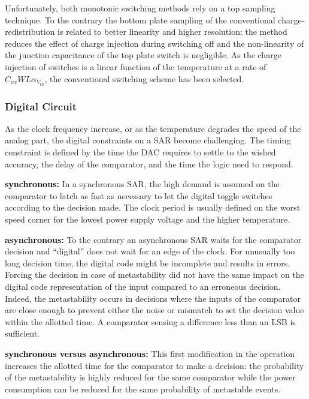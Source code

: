 Unfortunately, both monotonic switching methods rely on a top sampling technique. To the contrary the bottom plate sampling of the conventional charge-redistribution is related to better linearity and higher resolution: the method reduces the effect of charge injection during switching off and the non-linearity of the junction capacitance of the top plate switch is negligible. As the charge injection of switches is a linear function of the temperature at a rate of \(C_{ox}WL\alpha_{V_{th}}\), the conventional switching scheme has been selected.

	\subsubsection{Digital Circuit}         %
As the clock frequency increase, or as the temperature degrades the speed of the analog part, the digital constraints on a SAR become challenging. The timing constraint is defined by the time the DAC requires to settle to the wished accuracy, the delay of the comparator, and the time the logic need to respond.

\textbf{\textcolor{black}{synchronous:}}
In a synchronous SAR, the high demand is assumed on the comparator to latch as fast as necessary to let the digital toggle switches according to the decision made. The clock period is usually defined on the worst speed corner for the lowest power supply voltage and the higher temperature.

\textbf{\textcolor{black}{asynchronous:}}
To the contrary an asynchronous SAR waits for the comparator decision and ``digital'' does not wait for an edge of the clock. For unusually too long decision time, the digital code might be incomplete and results in errors. Forcing the decision in case of metastability did not have the same impact on the digital code representation of the input compared to an erroneous decision. Indeed, the metastability occurs in decisions where the inputs of the comparator are close enough to prevent either the noise or mismatch to set the decision value within the allotted time. A comparator sensing a difference less than an LSB is sufficient.

\textbf{\textcolor{black}{synchronous versus asynchronous:}}
This first modification in the operation increases the allotted time for the comparator to make a decision: the probability of the metastability is highly reduced for the same comparator while the power consumption can be reduced for the same probability of metastable events.

